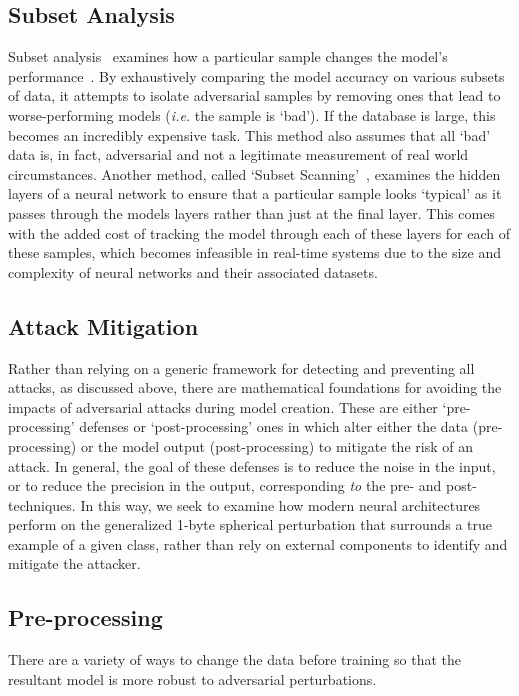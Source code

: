 \documentclass[journal]{IEEEtran}
\newcommand{\ie}{\textit{i.e.}\xspace}
\newcommand{\cm}[1]{\textit{{\color{blue}#1}}}
\begin{document}
\subsection{Subset Analysis}

Subset analysis~\cite{paudice_detection_2018} examines how a particular sample changes the model's performance~\cite{paudice_detection_2018}. By exhaustively comparing the model accuracy on various subsets of data, it attempts to isolate adversarial samples by removing ones that lead to worse-performing models (\ie the sample is `bad'). If the database is large, this becomes an incredibly expensive task. This method also assumes that all `bad' data is, in fact, adversarial and not a legitimate measurement of real world circumstances. Another method, called `Subset Scanning'~\cite{cintas_detecting_2020}, examines the hidden layers of a neural network to ensure that a particular sample looks `typical' as it passes through the models layers rather than just at the final layer. This comes with the added cost of tracking the model through each of these layers for each of these samples, which becomes infeasible in real-time systems due to the size and complexity of neural networks and their associated datasets.


\subsection{Attack Mitigation}

Rather than relying on a generic framework for detecting and preventing all attacks, as discussed above, there are mathematical foundations for avoiding the impacts of adversarial attacks during model creation. These are either `pre-processing' defenses or `post-processing' ones in which alter either the data (pre-processing) or the model output (post-processing) to mitigate the risk of an attack. In general, the goal of these defenses is to reduce the noise in the input, or to reduce the precision in the output, corresponding \cm{to} the pre- and post- techniques. In this way, we seek to examine how modern neural architectures perform on the generalized 1-byte spherical perturbation that surrounds a true example of a given class, rather than rely on external components to identify and mitigate the attacker.


\subsection{Pre-processing}
\label{pre-processing}
There are a variety of ways to change the data before training so that the resultant model is more robust to adversarial perturbations.
\end{document}
